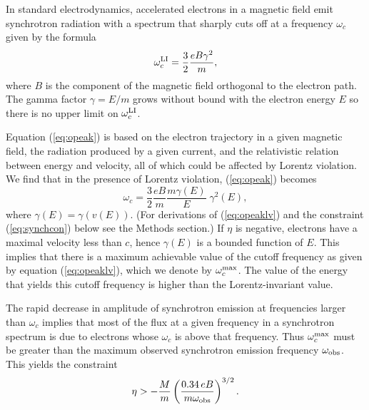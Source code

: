 \documentclass[12pt]{article}
\begin{document}
In standard electrodynamics, accelerated electrons in a magnetic
field emit synchrotron radiation with a spectrum that sharply cuts
off at a frequency $\omega_c$ given by the formula~\cite{Jackson}
%
\begin{equation}
 \omega_c^{\rm LI}=\frac{3}{2}\frac{eB\gamma^2}{m},
  \label{eq:opeak}
\end{equation}
%
where $B$ is the component of the magnetic field
orthogonal to the electron path. The gamma factor
$\gamma=E/m$ grows without bound with the electron energy
$E$ so there is no upper limit on $\omega_c^{\rm LI}$.


Equation (\ref{eq:opeak}) is based on the electron trajectory
in a given magnetic field, the radiation produced by a given
current, and the relativistic relation between energy and
velocity, all of which could be affected by Lorentz violation. We
find that in the presence of Lorentz violation, (\ref{eq:opeak})
becomes
\begin{equation}
\omega_c=\frac{3}{2} \frac{eB}{m}\frac{m\gamma(E)}{E}\;
\gamma^2(E), \label{eq:opeaklv}
\end{equation}
%
where $\gamma(E)=\gamma(v(E))$. (For derivations of
(\ref{eq:opeaklv}) and the constraint (\ref{eq:synchcon})
below see the Methods section.) If $\eta$ is negative,
electrons have a maximal velocity less than $c$, hence
$\gamma(E)$ is a bounded function of $E$.  This implies
that there is a maximum achievable value of the cutoff
frequency as given by equation (\ref{eq:opeaklv}), which
we denote by $\omega_c^{\rm max}$. The value of the
energy that yields this cutoff frequency is higher than
the Lorentz-invariant value.

The rapid decrease in amplitude of synchrotron emission
at frequencies larger than $\omega_c$ implies that most
of the flux at a given frequency in a synchrotron
spectrum is due to electrons whose $\omega_c$ is above
that frequency. Thus $\omega_c^{\rm max}$ must be greater
than the maximum observed synchrotron emission frequency
$\omega_{\rm obs}$. This yields the constraint
%
\begin{equation}
\eta > - \frac{M}{m}\left(\frac{0.34\, eB}{m\omega_{\rm
obs}}\right)^{3/2}. \label{eq:synchcon}
\end{equation}
%

\end{document}
